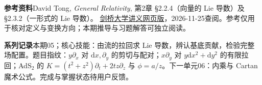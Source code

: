 \documentclass[11pt,a4paper]{article}
\newcommand{\D}{\mathrm d}\newcommand{\Lie}{\mathcal L}
\begin{document}
\textbf{参考资料}\quad David Tong, \emph{General Relativity}, 第2章 §2.2.4（向量的 Lie 导数）及 §2.3.2（一形式的 Lie 导数）。
\href{https://www.damtp.cam.ac.uk/user/tong/gr/grhtml/S2.html}{剑桥大学讲义网页版}，2026-11-25查阅。参考仅用于核对定义与变换方向；本期推导与习题解答可独立阅读。

\textbf{系列记录}\quad 本期05；核心技能：由流的拉回求 Lie 导数，辨认基底贡献，检验完整场配置。题目指纹：$y\partial_x$ 对 $\D x,\partial_y$ 的剪切与配对；$x\partial_y$ 对 $y\D x^2+\D y^2$ 的有限拉回；AdS$_2$ 的 $K=(t^2+z^2)\partial_t+2tz\partial_z$ 与 $\phi=a/z$。下一单元06：内乘与 Cartan 魔术公式。完成与掌握状态待用户反馈。
\end{document}
